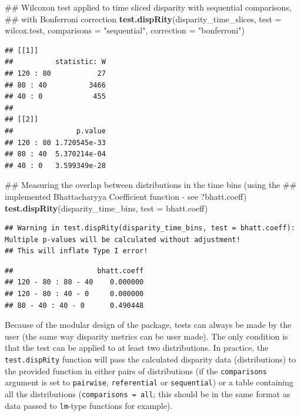 \documentclass[]{book}
\newenvironment{Shaded}{\begin{snugshade}}{\end{snugshade}}
\newcommand{\KeywordTok}[1]{\textcolor[rgb]{0.13,0.29,0.53}{\textbf{#1}}}
\newcommand{\DataTypeTok}[1]{\textcolor[rgb]{0.13,0.29,0.53}{#1}}
\newcommand{\StringTok}[1]{\textcolor[rgb]{0.31,0.60,0.02}{#1}}
\newcommand{\NormalTok}[1]{#1}
\theoremstyle{definition}
\theoremstyle{definition}
\theoremstyle{remark}
\begin{document}
\begin{Shaded}
\begin{Highlighting}[]
\NormalTok{## Wilcoxon test applied to time sliced disparity with sequential comparisons,}
\NormalTok{## with Bonferroni correction}
\KeywordTok{test.dispRity}\NormalTok{(disparity_time_slices, }\DataTypeTok{test =}\NormalTok{ wilcox.test,}
              \DataTypeTok{comparisons =} \StringTok{"sequential"}\NormalTok{, }\DataTypeTok{correction =} \StringTok{"bonferroni"}\NormalTok{)}
\end{Highlighting}
\end{Shaded}

\begin{verbatim}
## [[1]]
##          statistic: W
## 120 : 80           27
## 80 : 40          3466
## 40 : 0            455
## 
## [[2]]
##               p.value
## 120 : 80 1.720545e-33
## 80 : 40  5.370214e-04
## 40 : 0   3.599349e-28
\end{verbatim}

\begin{Shaded}
\begin{Highlighting}[]
\NormalTok{## Measuring the overlap between distributions in the time bins (using the}
\NormalTok{## implemented Bhattacharyya Coefficient function - see ?bhatt.coeff)}
\KeywordTok{test.dispRity}\NormalTok{(disparity_time_bins, }\DataTypeTok{test =}\NormalTok{ bhatt.coeff)}
\end{Highlighting}
\end{Shaded}

\begin{verbatim}
## Warning in test.dispRity(disparity_time_bins, test = bhatt.coeff): Multiple p-values will be calculated without adjustment!
## This will inflate Type I error!
\end{verbatim}

\begin{verbatim}
##                    bhatt.coeff
## 120 - 80 : 80 - 40    0.000000
## 120 - 80 : 40 - 0     0.000000
## 80 - 40 : 40 - 0      0.490448
\end{verbatim}

Because of the modular design of the package, tests can always be made
by the user (the same way disparity metrics can be user made). The only
condition is that the test can be applied to at least two distributions.
In practice, the \texttt{test.dispRity} function will pass the
calculated disparity data (distributions) to the provided function in
either pairs of distributions (if the \texttt{comparisons} argument is
set to \texttt{pairwise}, \texttt{referential} or \texttt{sequential})
or a table containing all the distributions
(\texttt{comparisons\ =\ all}; this should be in the same format as data
passed to \texttt{lm}-type functions for example).
\end{document}
